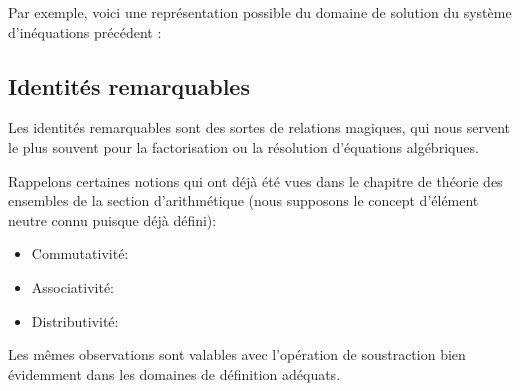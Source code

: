 	Par exemple, voici une représentation possible du domaine de solution du système d'inéquations précédent :
	\begin{center}
	\end{center}
	
	\subsection{Identités remarquables}\label{calculus remarkable identities}
	Les identités remarquables sont des sortes de relations magiques, qui nous servent le plus souvent pour la factorisation ou la résolution d'équations algébriques.

	Rappelons certaines notions qui ont déjà été vues dans le chapitre de théorie des ensembles de la section d'arithmétique (nous supposons le concept d'élément neutre connu puisque déjà défini):
	\begin{itemize}
		\item Commutativité:
		
		
		\item Associativité:
		
		
		\item Distributivité:
		
	\end{itemize}
	Les mêmes observations sont valables avec l'opération de soustraction bien évidemment dans les domaines de définition adéquats.
	
